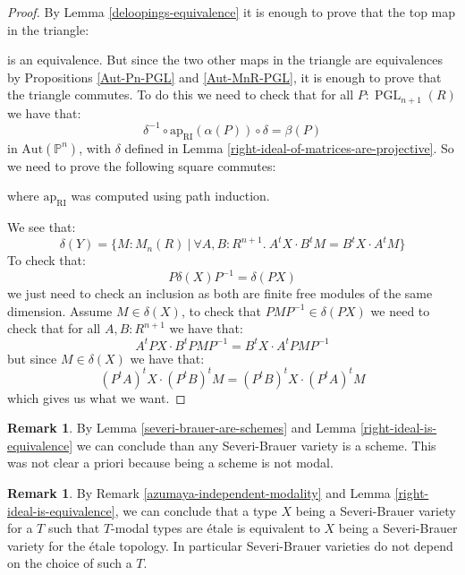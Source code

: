 \documentclass[10pt,a4paper]{article}
\theoremstyle{definition}
\newtheorem{remark}[theorem]{Remark}
\DeclareMathOperator{\PGL}{PGL}
\newcommand{\RI}{\mathrm{RI}}
\newcommand{\bP}{\mathbb{P}}
\newcommand{\Aut}{\mathrm{Aut}}
\begin{document}
\begin{proof}
By Lemma \ref{deloopings-equivalence} it is enough to prove that the top map in the triangle:
\begin{center}
\end{center}
is an equivalence. But since the two other maps in the triangle are equivalences by Propositions \ref{Aut-Pn-PGL} and \ref{Aut-MnR-PGL}, it is enough to prove that the triangle commutes. To do this we need to check that for all $P:\PGL_{n+1}(R)$ we have that:
\[\delta^{-1}\circ \mathrm{ap}_\RI(\alpha(P))\circ\delta = \beta(P)\]
in $\Aut(\bP^n)$, with $\delta$ defined in Lemma \ref{right-ideal-of-matrices-are-projective}. So we need to prove the following square commutes:
\begin{center}
\end{center}
where $\mathrm{ap}_\RI$ was computed using path induction.

We see that:
\[\delta(Y) = \{M:M_n(R)\ |\ \forall A,B:R^{n+1}.\ A^tX\cdot B^tM = B^tX\cdot A^tM\}\]
To check that:
\[P\delta(X)P^{-1} = \delta(PX)\]
we just need to check an inclusion as both are finite free modules of the same dimension. Assume $M\in\delta(X)$, to check that $PMP^{-1}\in\delta(PX)$ we need to check that for all $A,B:R^{n+1}$ we have that:
\[A^tPX\cdot B^tPMP^{-1} = B^tX\cdot A^tPMP^{-1}\]
but since $M\in\delta(X)$ we have that:
\[(P^tA)^tX\cdot (P^tB)^tM = (P^tB)^tX\cdot (P^tA)^tM\]
which gives us what we want.
\end{proof}

\begin{remark}
By Lemma \ref{severi-brauer-are-schemes} and Lemma \ref{right-ideal-is-equivalence} we can conclude than any Severi-Brauer variety is a scheme. This was not clear a priori because being a scheme is not modal.
\end{remark}

\begin{remark}\label{severi-brauer-independent-modality}
By Remark \ref{azumaya-independent-modality} and Lemma \ref{right-ideal-is-equivalence}, we can conclude that a type $X$ being a Severi-Brauer variety for a $T$ such that $T$-modal types are étale is equivalent to $X$ being a Severi-Brauer variety for the étale topology. In particular Severi-Brauer varieties do not depend on the choice of such a $T$.
\end{remark}
\end{document}
